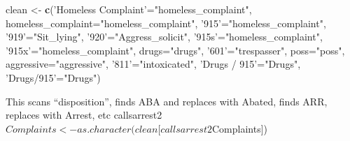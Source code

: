 \documentclass[]{book}
\newenvironment{Shaded}{\begin{snugshade}}{\end{snugshade}}
\newcommand{\CommentTok}[1]{\textcolor[rgb]{0.56,0.35,0.01}{\textit{#1}}}
\newcommand{\DataTypeTok}[1]{\textcolor[rgb]{0.13,0.29,0.53}{#1}}
\newcommand{\DecValTok}[1]{\textcolor[rgb]{0.00,0.00,0.81}{#1}}
\newcommand{\KeywordTok}[1]{\textcolor[rgb]{0.13,0.29,0.53}{\textbf{#1}}}
\newcommand{\NormalTok}[1]{#1}
\newcommand{\OperatorTok}[1]{\textcolor[rgb]{0.81,0.36,0.00}{\textbf{#1}}}
\newcommand{\StringTok}[1]{\textcolor[rgb]{0.31,0.60,0.02}{#1}}
\begin{document}
\begin{Shaded}
\begin{Highlighting}[]
\NormalTok{clean <-}\StringTok{ }\KeywordTok{c}\NormalTok{(}\StringTok{'Homeless Complaint'}\NormalTok{=}\StringTok{"homeless_complaint"}\NormalTok{, }\DataTypeTok{homeless_complaint=}\StringTok{"homeless_complaint"}\NormalTok{, }\StringTok{'915'}\NormalTok{=}\StringTok{"homeless_complaint"}\NormalTok{, }
           \StringTok{'919'}\NormalTok{=}\StringTok{"Sit_lying"}\NormalTok{, }\StringTok{'920'}\NormalTok{=}\StringTok{"Aggress_solicit"}\NormalTok{, }\StringTok{'915s'}\NormalTok{=}\StringTok{"homeless_complaint"}\NormalTok{, }\StringTok{'915x'}\NormalTok{=}\StringTok{"homeless_complaint"}\NormalTok{, }
           \DataTypeTok{drugs=}\StringTok{"drugs"}\NormalTok{, }\StringTok{'601'}\NormalTok{=}\StringTok{"trespasser"}\NormalTok{, }\DataTypeTok{poss=}\StringTok{"poss"}\NormalTok{, }\DataTypeTok{aggressive=}\StringTok{"aggressive"}\NormalTok{, }\StringTok{'811'}\NormalTok{=}\StringTok{"intoxicated"}\NormalTok{, }
           \StringTok{'Drugs / 915'}\NormalTok{=}\StringTok{"Drugs"}\NormalTok{, }\StringTok{'Drugs/915'}\NormalTok{=}\StringTok{"Drugs"}\NormalTok{)}
\end{Highlighting}
\end{Shaded}

This scans ``disposition'', finds ABA and replaces with Abated, finds ARR, replaces with Arrest, etc
callsarrest2\(Complaints <- as.character(clean[callsarrest2\)Complaints{]})

\begin{Shaded}
\end{Shaded}
\end{document}

